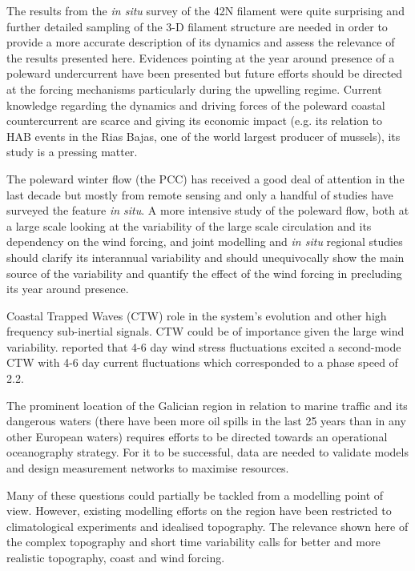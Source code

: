 The results from the \emph{in situ} survey of the 42\deg N
filament were quite surprising and further detailed sampling of
the 3-D filament structure are needed in order to provide a more
accurate description of its dynamics and assess the relevance of
the results presented here. Evidences pointing at the year around
presence of a poleward undercurrent have been presented but future
efforts should be directed at the forcing mechanisms particularly
during the upwelling regime. Current knowledge regarding the
dynamics and  driving forces of the poleward coastal
countercurrent are scarce and giving its economic impact (e.g. its
relation to HAB events in the Rias Bajas, one of the world largest
producer of mussels), its study is a pressing matter.

The poleward winter flow (the PCC) has received a good deal of
attention in the last decade but mostly from remote sensing and
only a handful of studies have surveyed the feature \emph{in
situ}. A more intensive study of the poleward flow, both at a
large scale looking at the variability of the large scale
circulation and its dependency on the wind forcing, and joint
modelling and \emph{in situ} regional studies should clarify its
interannual variability and should unequivocally show the main
source of the variability and quantify the effect of the wind
forcing in precluding its year around presence.

Coastal Trapped Waves (CTW) role in the system's evolution and
other high frequency sub-inertial signals. CTW could be of
importance given the large wind variability. \citet{Huthnance02}
reported that 4-6 day wind stress fluctuations excited a
second-mode CTW with 4-6 day current fluctuations which
corresponded to a phase speed of 2.2\vel.

The prominent location of the Galician region in relation to
marine traffic and its dangerous waters (there have been more oil
spills in the last 25 years than in any other European waters)
requires efforts to be directed towards an operational
oceanography strategy. For it to be successful, data are needed to
validate models and design measurement networks to maximise
resources.

Many of these questions could partially be tackled from a
modelling point of view. However, existing modelling efforts on
the region have been restricted to climatological experiments and
idealised topography. The relevance shown here of the complex
topography and short time variability calls for better and more
realistic topography, coast and wind forcing.
